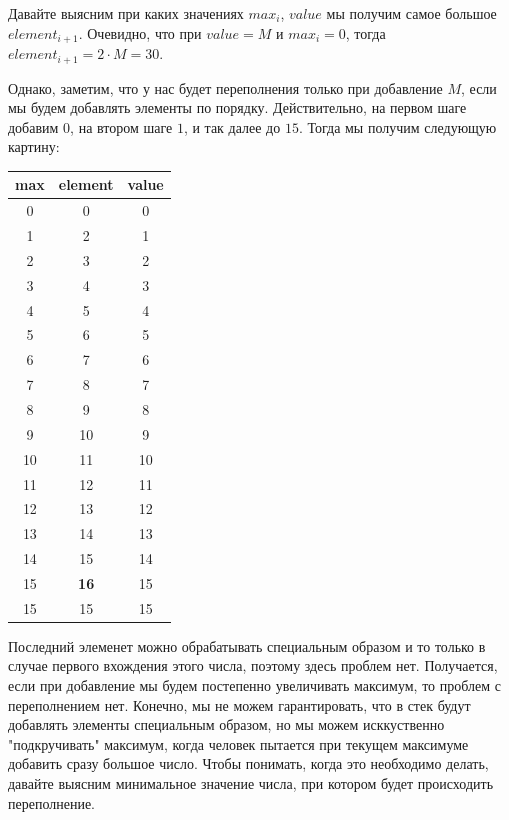 Давайте выясним при каких значениях \(max_i\), \(value\) мы получим самое большое \(element_{i+1}\). Очевидно, что при \(value = M\) и \(max_i = 0\), тогда \(element_{i+1} = 2\cdot M = 30\). 

Однако, заметим, что у нас будет переполнения только при добавление \(M\), если мы будем добавлять элементы по порядку. Действительно, на первом шаге добавим \(0\), на втором шаге \(1\), и так далее до \(15\). Тогда мы получим следующую картину:
\begin{table}[H]
    \centering
    \begin{tabular}{|c|c|c|}
        \hline max & element &  value \\ \hline
         0   & 0       &  0     \\ \hline
         1   & 2       &  1     \\ \hline
         2   & 3       &  2     \\ \hline
         3   & 4       &  3     \\ \hline
         4   & 5       &  4     \\ \hline
         5   & 6       &  5     \\ \hline
         6   & 7       &  6     \\ \hline
         7   & 8       &  7     \\ \hline
         8   & 9       &  8     \\ \hline
         9   & 10      &  9     \\ \hline
         10  & 11      &  10    \\ \hline
         11  & 12      &  11    \\ \hline
         12  & 13      &  12    \\ \hline
         13  & 14      &  13    \\ \hline
         14  & 15      &  14    \\ \hline
         15  & \textbf{16}  &  15    \\ \hline
         15  & 15      &  15    \\ \hline
    \end{tabular}
\end{table}

Последний элеменет можно обрабатывать специальным образом и то только в случае первого вхождения этого числа, поэтому здесь проблем нет. Получается, если при добавление мы будем постепенно увеличивать максимум, то проблем с переполнением нет. Конечно, мы не можем гарантировать, что в стек будут добавлять элементы специальным образом, но мы можем исккуственно "подкручивать"{} максимум, когда человек пытается при текущем максимуме добавить сразу большое число. Чтобы понимать, когда это необходимо делать, давайте выясним минимальное значение числа, при котором будет происходить переполнение.

